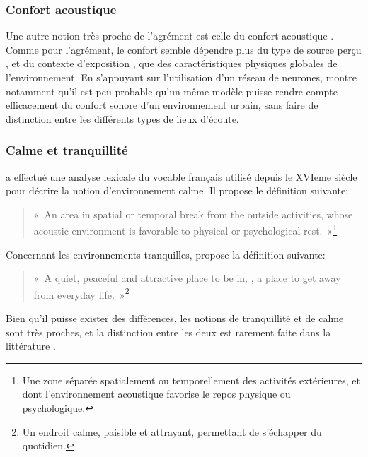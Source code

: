 \subsubsection{Confort acoustique}
\label{sec:ch3_confort}

Une autre notion très proche de l'agrément est celle du confort acoustique \citep{jeon2011non,tse2012perception,jeon2013soundwalk}. Comme pour l'agrément, le confort semble dépendre plus du type de source perçu \citep{yang2005acoustic}, et du contexte d'exposition \citep{meng2013field}, que des caractéristiques physiques globales de l'environnement. En s'appuyant sur l'utilisation d'un réseau de neurones, \citep{yu2009modeling} montre notamment qu'il est peu probable qu'un même modèle puisse rendre compte efficacement du confort sonore d'un environnement urbain, sans faire de distinction entre les différents types de lieux d'écoute.

\subsubsection{Calme et tranquillité}

\citep{delaitre2012definition} a effectué une analyse lexicale du vocable français utilisé depuis le XVIeme siècle pour décrire la notion d'environnement calme. Il propose le définition suivante:

\begin{quote}
«~An area in spatial or temporal break from the outside activities, whose acoustic environment is favorable to physical or psychological rest.~»\footnote{Une zone séparée spatialement ou temporellement des activités extérieures, et dont l'environnement acoustique favorise le repos physique ou psychologique.}
\end{quote}

Concernant les environnements tranquilles, \citep{pheasant2008acoustic} propose la définition suivante:

\begin{quote}
«~A quiet, peaceful and attractive place to be in, \ie, a place to get away from everyday life.~»\footnote{Un endroit calme, paisible et attrayant, permettant de s'échapper du quotidien.}
\end{quote}

Bien qu'il puisse exister des différences, les notions de tranquillité et de calme sont très proches, et la distinction entre les deux est rarement faite dans la littérature \citep{delaitre2012definition}. 

